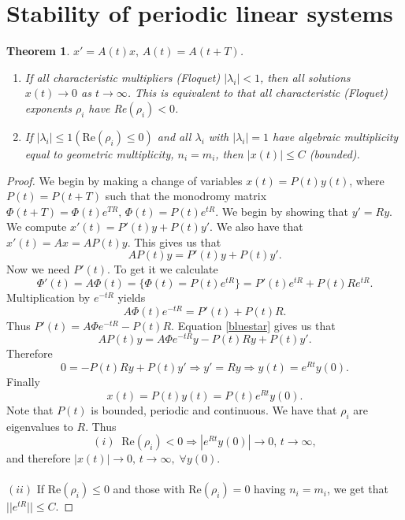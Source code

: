 \documentclass[12pt, a4paper]{article}
\newtheorem{theorem}{Theorem}[section]
\begin{document}
\section{Stability of periodic linear systems}
\begin{theorem}
$x' = A(t)x,\, A(t) = A(t+T)$.
\begin{enumerate}[label=(\roman*)]
\item If all characteristic multipliers (Floquet) $|\lambda_i|<1$, then all solutions $x(t)\to 0$ as $t\to \infty$. This is equivalent to that all characteristic (Floquet) exponents $\rho_i$ have Re$(\rho_i)<0$.
\item If $|\lambda_i|\leq1 (\text{Re}(\rho_i)\leq0)$ and all $\lambda_i$ with $|\lambda_i|=1$ have algebraic multiplicity equal to geometric multiplicity, $n_i=m_i$, then $|x(t)|\leq C$ (bounded).
\end{enumerate}
\end{theorem}
\begin{proof}
We begin by making a change of variables $x(t) = P(t)y(t)$, where $P(t)=P(t+T)$ such that the monodromy matrix $\Phi(t+T) = \Phi(t)e^{TR},\, \Phi(t)=P(t)e^{tR}$. We begin by showing that $y' = Ry$. We compute $x'(t) = P'(t)y + P(t)y'$. We also have that $x'(t) = Ax = AP(t)y$. This gives us that
\begin{equation}
\label{bluestar}
AP(t)y = P'(t)y + P(t)y'.
\end{equation}
Now we need $P'(t)$. To get it we calculate
\begin{equation*}
\Phi'(t) = A\Phi(t) = \{ \Phi(t) = P(t)e^{tR}\} = P'(t)e^{tR} + P(t)Re^{tR}.
\end{equation*}
Multiplication by $e^{-tR}$ yields
\begin{equation*}
A\Phi(t)e^{-tR} = P'(t) + P(t)R.
\end{equation*}
Thus $P'(t) = A\Phi e^{-tR} - P(t)R$. Equation \eqref{bluestar} gives us that
\begin{equation*}
AP(t)y = A\Phi e^{-tR}y - P(t)Ry + P(t)y'.
\end{equation*}
Therefore
\begin{equation*}
0 = -P(t)Ry + P(t)y' \Rightarrow y' = Ry \Rightarrow y(t) = e^{Rt}y(0).
\end{equation*}
Finally
\begin{equation*}
x(t)=P(t)y(t) = P(t)e^{Rt}y(0).
\end{equation*}
Note that $P(t)$ is bounded, periodic and continuous. We have that $\rho_i$ are eigenvalues to $R$. Thus
\begin{equation*}
(i)\;\; \text{Re}(\rho_i)<0 \Rightarrow |e^{Rt}y(0)|\to 0,\, t\to\infty,
\end{equation*}
and therefore $|x(t)|\to 0,\, t\to\infty,\; \forall y(0)$.
\\\\
$(ii)$ If Re$(\rho_i)\leq 0$ and those with Re$(\rho_i) = 0$ having $n_i=m_i$, we get that $||e^{tR}||\leq C$.
\end{proof}
\end{document}
